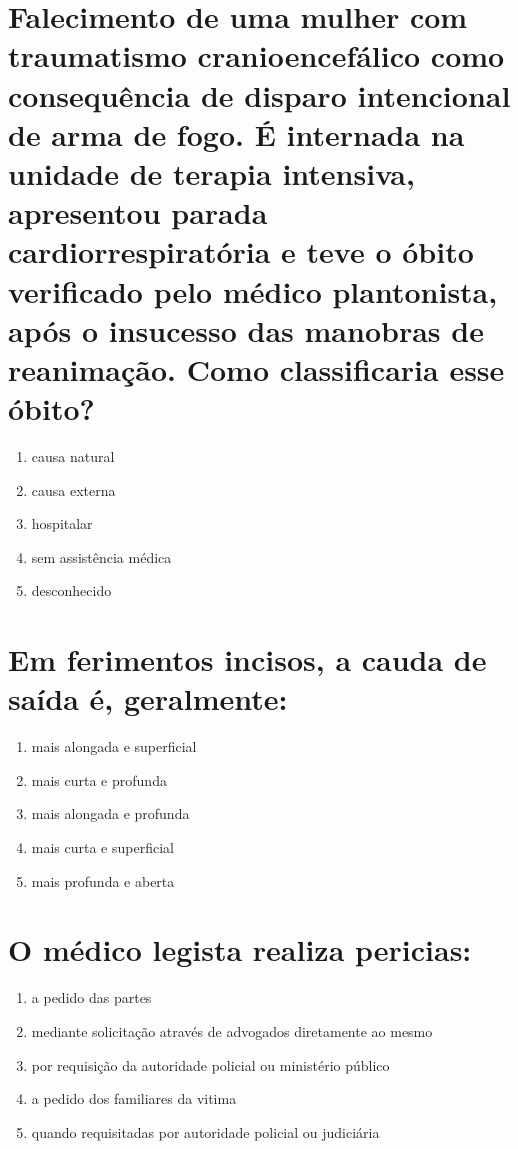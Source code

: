 \documentclass[11pt,notitlepage]{article}
\begin{document}
\section{Falecimento de uma mulher com traumatismo cranioencefálico como consequência de disparo intencional de arma de fogo.  É internada na unidade de terapia intensiva, apresentou parada cardiorrespiratória e teve o óbito verificado pelo médico plantonista, após o insucesso das manobras de reanimação. Como classificaria esse óbito? }
\begin{multicols}{2}
	\setlength{\columnseprule}{0pt}
	\begin{enumerate}[label=(\alph*)]
		\item causa natural
		\item causa externa
		\item hospitalar
		\item sem assistência médica
		\item desconhecido
	\end{enumerate}
\end{multicols}
\vspace{0.5cm}

\section{Em ferimentos incisos, a cauda de saída é, geralmente:}
\begin{multicols}{2}
	\setlength{\columnseprule}{0pt}
	\begin{enumerate}[label=(\alph*)]
		\item mais alongada e superficial
		\item mais curta e profunda
		\item mais alongada e profunda
		\item mais curta e superficial
		\item mais profunda e aberta
	\end{enumerate}
\end{multicols}
\vspace{0.5cm}

\section{O médico legista realiza pericias:}
\begin{multicols}{2}
	\setlength{\columnseprule}{0pt}
	\begin{enumerate}[label=(\alph*)]
		\item a pedido das partes
		\item mediante solicitação através de advogados diretamente ao mesmo
		\item por requisição da autoridade policial ou ministério público
		\item a pedido dos familiares da vitima
		\item quando requisitadas por autoridade policial ou judiciária
	\end{enumerate}
\end{multicols}
\vspace{0.5cm}

\end{document}
